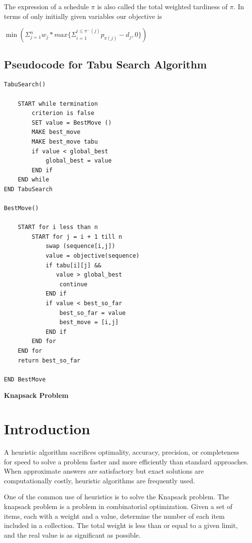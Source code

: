 \documentclass[conference]{IEEEtran}
\begin{document}
The expression of a schedule $\pi$ is also called the total weighted tardiness of $\pi$. 
In terms of only initially given variables our objective is 
\begin{center}
    $\min (\Sigma^{n}_{j = 1} w_j * max{\{\Sigma^{i \leq \pi^{-}(j)}_{i = 1}} p_{\pi (j)} - d_j, 0\})$
\end{center}

\newpage
\subsection{Pseudocode for Tabu Search Algorithm}
\begin{lstlisting}
TabuSearch()

    START while termination 
        criterion is false
        SET value = BestMove ()
        MAKE best_move
        MAKE best_move tabu
        if value < global_best
            global_best = value
        END if
    END while
END TabuSearch

BestMove()

    START for i less than n
        START for j = i + 1 till n
            swap (sequence[i,j]) 
            value = objective(sequence)
            if tabu[i][j] && 
               value > global_best
                continue
            END if
            if value < best_so_far
                best_so_far = value
                best_move = [i,j]
            END if
        END for
    END for
    return best_so_far
    
END BestMove

\end{lstlisting}

\newpage
\setcounter{section}{0}
\renewcommand*{\theHsection}{chX.\the\value{section}}
\begin{center}
\Large{\textbf{Knapsack Problem}}
\end{center}
\section{\textbf{Introduction}}

A heuristic algorithm sacrifices optimality, accuracy, precision, or completeness for speed to solve a problem faster and more efficiently than standard approaches. When approximate answers are satisfactory but exact solutions are computationally costly, heuristic algorithms are frequently used.

\par
One of the common use of heuristics is to solve the Knapsack problem. The knapsack problem is a problem in combinatorial optimization. Given a set of items, each with a weight and a value, determine the number of each item included in a collection. The total weight is less than or equal to a given limit, and the real value is as significant as possible.
\end{document}
